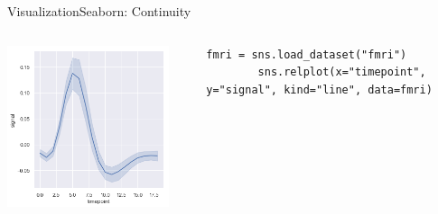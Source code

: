 \documentclass[10pt,compress]{beamer} %
\begin{document}
\begin{frame}[fragile]{Visualization}{Seaborn: Continuity}
	\begin{columns}
		\includegraphics[width=0.9\textwidth]{figs/sns-line.png}\\
		\begin{exampleblock}{\footnotesize{}}
		\vspace{-0.2cm} 
		\begin{lstlisting}[basicstyle=\tiny]
		fmri = sns.load_dataset("fmri")
		sns.relplot(x="timepoint", y="signal", kind="line", data=fmri)
		\end{lstlisting}
		\vspace{-0.2cm} 
		\end{exampleblock}


\end{columns}
\end{frame}
\end{document}
